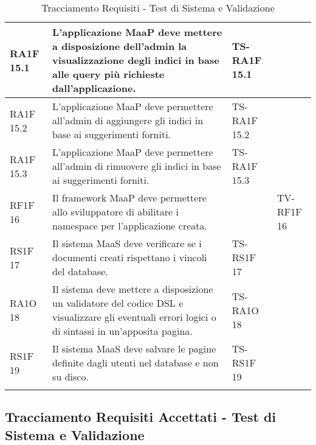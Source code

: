 \begin{center}
\begin{longtable}{| p{2cm} | p{6cm} | p{2.5cm} | p{2.5cm} | }
				RA1F 15.1 & 
				L’applicazione MaaP deve mettere a disposizione dell’admin la visualizzazione degli indici in base alle query più richieste dall’applicazione. & TS-RA1F 15.1 & \\ \hline 
				RA1F 15.2 & 
				L’applicazione MaaP deve permettere all’admin di aggiungere gli indici in base ai suggerimenti forniti. & TS-RA1F 15.2 & \\ \hline 
				RA1F 15.3 & 
				L’applicazione MaaP deve permettere all’admin di rimuovere gli indici in base ai suggerimenti forniti. & TS-RA1F 15.3 & \\ \hline 
				RF1F 16 & 
				Il framework MaaP deve permettere allo sviluppatore di abilitare i namespace per l’applicazione creata. &  & TV-RF1F 16 \\ \hline 
				RS1F 17 & 
				Il sistema MaaS deve verificare se i documenti creati rispettano i vincoli del database. & TS-RS1F 17 & \\ \hline 
				RA1O 18 & 
				Il sistema deve mettere a disposizione un validatore del codice DSL e visualizzare gli eventuali errori logici o di sintassi in un'apposita pagina. & TS-RA1O 18 & \\ \hline 
				RS1F 19 & 
				Il sistema MaaS deve salvare le pagine definite dagli utenti nel database e non su disco. & TS-RS1F 19 & \\ \hline 
		\caption{Tracciamento Requisiti - Test di Sistema e Validazione}
		\end{longtable}
	 \egroup
\end{center}
\clearpage

\subsection{Tracciamento Requisiti Accettati - Test di Sistema e Validazione}

